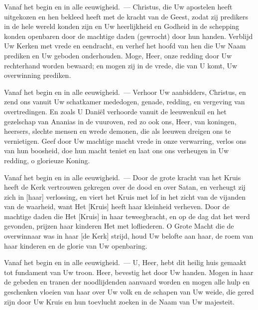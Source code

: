 \documentclass[12pt,twoside,a5paper]{article}
\begin{document}
\begin{halfparskip}
   Vanaf het begin en in alle eeuwigheid.~--- Christus, die Uw apostelen heeft uitgekozen en hen bekleed heeft met de kracht van de Geest, zodat zij predikers in de hele wereld konden zijn en Uw heerlijkheid en Godheid in de schepping konden openbaren door de machtige daden (gewrocht) door hun handen. Verblijd Uw Kerken met vrede en eendracht, en verhef het hoofd van hen die Uw Naam prediken en Uw geboden onderhouden. Moge, Heer, onze redding door Uw rechterhand worden bewaard; en mogen zij in de vrede, die van U komt, Uw overwinning prediken.
\end{halfparskip}

\begin{halfparskip}
   Vanaf het begin en in alle eeuwigheid.~--- Verhoor Uw aanbidders, Christus, en zend ons vanuit Uw schatkamer mededogen, genade, redding, en vergeving van overtredingen. En zoals U Daniël verhoorde vanuit de leeuwenkuil en het gezelschap van Ananias in de vuuroven, red zo ook ons, Heer, van koningen, heersers, slechte mensen en wrede demonen, die als leeuwen dreigen ons te vernietigen. Geef door Uw machtige macht vrede in onze verwarring, verlos ons van hun boosheid, doe hun macht teniet en laat ons ons verheugen in Uw redding, o glorieuze Koning.
\end{halfparskip}

\begin{halfparskip}
   Vanaf het begin en in alle eeuwigheid.~--- Door de grote kracht van het Kruis heeft de Kerk vertrouwen gekregen over de dood en over Satan, en verheugt zij zich in [haar] verlossing, en viert het Kruis met lof in het zicht van de vijanden van de waarheid, want Het [Kruis] heeft haar kleinheid verheven. Door de machtige daden die Het [Kruis] in haar teweegbracht, en op de dag dat het werd gevonden, prijzen haar kinderen Het met lofliederen. O Grote Macht die de overwinnaar was in haar [de Kerk] strijd, houd Uw belofte aan haar, de roem van haar kinderen en de glorie van Uw openbaring.
\end{halfparskip}

\begin{halfparskip}
   Vanaf het begin en in alle eeuwigheid.~--- U, Heer, hebt dit heilig huis gemaakt tot fundament van Uw troon. Heer, bevestig het door Uw handen. Mogen in haar de gebeden en tranen der noodlijdenden aanvaard worden en mogen alle hulp en geschenken vloeien van haar over Uw volk en de schapen van Uw weide, die gered zijn door Uw Kruis en hun toevlucht zoeken in de Naam van Uw majesteit.
\end{halfparskip}
\end{document}
